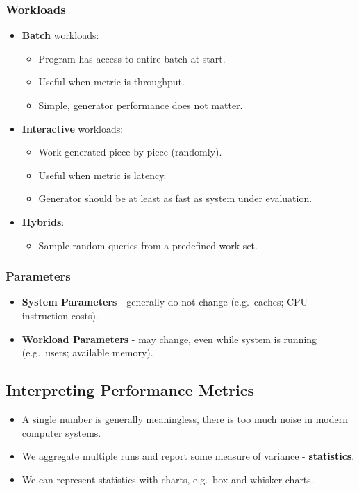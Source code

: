\documentclass[11pt]{article}
\begin{document}
\subsubsection{Workloads}
\begin{itemize}
  \item \textbf{Batch} workloads:
    \begin{itemize}
      \item Program has access to entire batch at start.
      \item Useful when metric is throughput.
      \item Simple, generator performance does not matter.
    \end{itemize}
  \item \textbf{Interactive} workloads:
    \begin{itemize}
      \item Work generated piece by piece (randomly).
      \item Useful when metric is latency.
      \item Generator should be at least as fast as system under evaluation.
    \end{itemize}
  \item \textbf{Hybrids}:
    \begin{itemize}
      \item Sample random queries from a predefined work set.
    \end{itemize}
\end{itemize}

\subsubsection{Parameters}
\begin{itemize}
  \item \textbf{System Parameters} - generally do not change (e.g.\ caches; CPU instruction costs).
  \item \textbf{Workload Parameters} - may change, even while system is running (e.g.\ users; available memory).
\end{itemize}

\subsection{Interpreting Performance Metrics}
\begin{itemize}
  \item A single number is generally meaningless, there is too much noise in modern computer systems.
  \item We aggregate multiple runs and report some measure of variance - \textbf{statistics}.
  \item We can represent statistics with charts, e.g.\ box and whisker charts.
\end{itemize}
\end{document}

